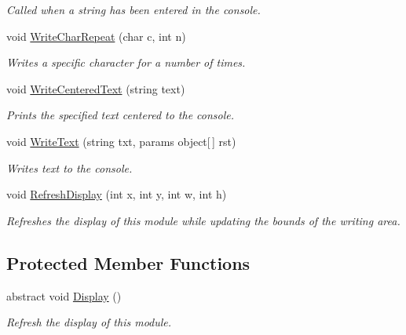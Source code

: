 \begin{DoxyCompactItemize}
\begin{DoxyCompactList}\small\item\em Called when a string has been entered in the console.\end{DoxyCompactList}\item 
void \hyperlink{class_m_b_c_1_1_terminal_1_1_terminal_module_a3d3fbe97a0b7fd5e8017ce14452cc87b}{Write\-Char\-Repeat} (char c, int n)
\begin{DoxyCompactList}\small\item\em Writes a specific character for a number of times.\end{DoxyCompactList}\item 
void \hyperlink{class_m_b_c_1_1_terminal_1_1_terminal_module_a88379c426262f0f211bf6ef83caf5242}{Write\-Centered\-Text} (string text)
\begin{DoxyCompactList}\small\item\em Prints the specified text centered to the console.\end{DoxyCompactList}\item 
\hypertarget{class_m_b_c_1_1_terminal_1_1_terminal_module_ab0471d26486daccea54e08d45f6064be}{void \hyperlink{class_m_b_c_1_1_terminal_1_1_terminal_module_ab0471d26486daccea54e08d45f6064be}{Write\-Text} (string txt, params object\mbox{[}$\,$\mbox{]} rst)}\label{class_m_b_c_1_1_terminal_1_1_terminal_module_ab0471d26486daccea54e08d45f6064be}

\begin{DoxyCompactList}\small\item\em Writes text to the console.\end{DoxyCompactList}\item 
\hypertarget{class_m_b_c_1_1_terminal_1_1_terminal_module_aafba6c46d47f11112a4aa5e58dc4b610}{void \hyperlink{class_m_b_c_1_1_terminal_1_1_terminal_module_aafba6c46d47f11112a4aa5e58dc4b610}{Refresh\-Display} (int x, int y, int w, int h)}\label{class_m_b_c_1_1_terminal_1_1_terminal_module_aafba6c46d47f11112a4aa5e58dc4b610}

\begin{DoxyCompactList}\small\item\em Refreshes the display of this module while updating the bounds of the writing area.\end{DoxyCompactList}\end{DoxyCompactItemize}
\subsection*{Protected Member Functions}
\begin{DoxyCompactItemize}
\item 
\hypertarget{class_m_b_c_1_1_terminal_1_1_terminal_module_ac801220b5575bab3c43b41431e87f560}{abstract void \hyperlink{class_m_b_c_1_1_terminal_1_1_terminal_module_ac801220b5575bab3c43b41431e87f560}{Display} ()}\label{class_m_b_c_1_1_terminal_1_1_terminal_module_ac801220b5575bab3c43b41431e87f560}

\begin{DoxyCompactList}\small\item\em Refresh the display of this module.\end{DoxyCompactList}\end{DoxyCompactItemize}
